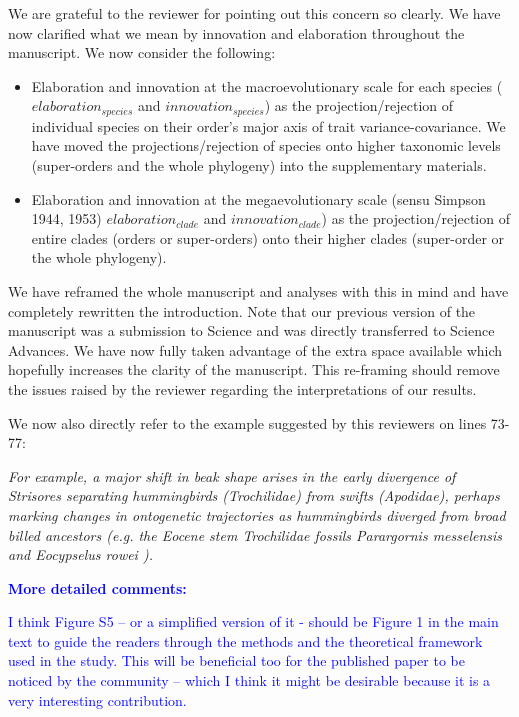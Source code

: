 \documentclass[12pt,letterpaper]{article}
\begin{document}
We are grateful to the reviewer for pointing out this concern so clearly. We have now clarified what we mean by innovation and elaboration throughout the manuscript. We now consider the following:
\begin{itemize}
    \item Elaboration and innovation at the macroevolutionary scale for each species ($elaboration_{species}$ and $innovation_{species}$) as the projection/rejection of individual species on their order’s major axis of trait variance-covariance. We have moved the projections/rejection of species onto higher taxonomic levels (super-orders and the whole phylogeny) into the supplementary materials.
    \item Elaboration and innovation at the megaevolutionary scale (sensu Simpson 1944, 1953) $elaboration_{clade}$ and $innovation_{clade}$) as the projection/rejection of entire clades (orders or super-orders) onto their higher clades (super-order or the whole phylogeny).
\end{itemize}
We have reframed the whole manuscript and analyses with this in mind and have completely rewritten the introduction. Note that our previous version of the manuscript was a submission to Science and was directly transferred to Science Advances. We have now fully taken advantage of the extra space available which hopefully increases the clarity of the manuscript. This re-framing should remove the issues raised by the reviewer regarding the interpretations of our results.

We now also directly refer to the example suggested by this reviewers on lines 73-77:%

\noindent\textit{For example, a major shift in beak shape arises in the early divergence of Strisores separating hummingbirds (Trochilidae) from swifts (Apodidae), perhaps marking changes in ontogenetic trajectories \cite{navalon2021} as hummingbirds diverged from broad billed ancestors (e.g. the Eocene stem Trochilidae fossils \textit{Parargornis messelensis} and \textit{Eocypselus rowei} \cite{mayr2003new, ksepka2013fossil}).} %


\textbf{\textcolor{blue}{More detailed comments:}}

\textcolor{blue}{I think Figure S5 – or a simplified version of it - should be Figure 1 in the main text to guide the readers through the methods and the theoretical framework used in the study. This will be beneficial too for the published paper to be noticed by the community – which I think it might be desirable because it is a very interesting contribution.}
\end{document}
